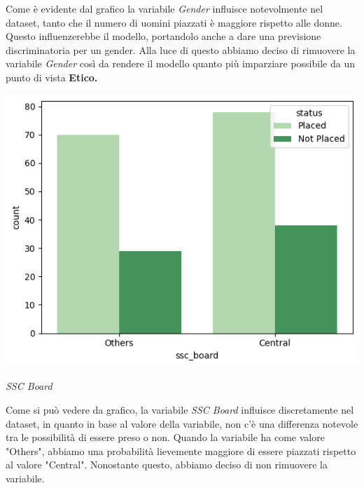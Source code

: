 \documentclass[12pt]{article}
\begin{document}
Come è evidente dal grafico la variabile \textit{Gender} influisce notevolmente nel dataset, tanto che il numero di uomini piazzati è maggiore rispetto alle donne. Questo influenzerebbe il modello, portandolo anche a dare una previsione discriminatoria per un gender.
Alla luce di questo abbiamo deciso di rimuovere la variabile \textit{Gender} così da rendere il modello quanto più imparziare possibile da un punto di vista \textbf{Etico.}

\begin{center}

    \includegraphics[scale=0.5]{sscboard.png}

    \textit{SSC Board}
\end{center}
Come si può vedere da grafico, la variabile \textit{SSC Board} influisce discretamente nel dataset, in quanto in base al valore della variabile, non c'è una differenza notevole tra le possibilità di essere preso o non. Quando la variabile ha come valore "Others", abbiamo una probabilità lievemente maggiore di essere piazzati rispetto al valore "Central".
Nonostante questo, abbiamo deciso di non rimuovere la variabile.
\end{document}
